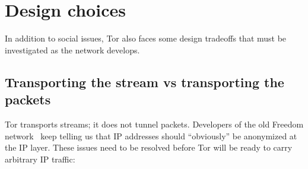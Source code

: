\documentclass{llncs}
\begin{document}

\section{Design choices}

In addition to social issues, Tor also faces some design tradeoffs that must
be investigated as the network develops.

\subsection{Transporting the stream vs transporting the packets}
\label{subsec:stream-vs-packet}
\label{subsec:tcp-vs-ip}

Tor transports streams; it does not tunnel packets.
Developers of the old Freedom network~\cite{freedom21-security}
keep telling us that IP addresses should ``obviously'' be anonymized
at the IP layer. These issues need to be resolved before
Tor will be ready to carry arbitrary IP traffic:
\end{document}

